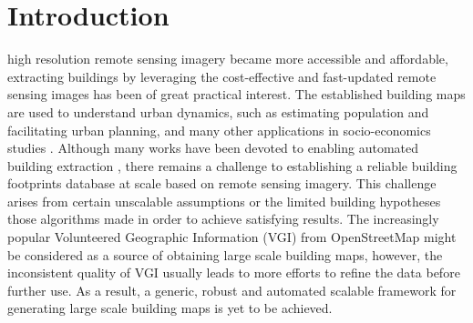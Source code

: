\documentclass[journal]{IEEEtran}
\begin{document}
%
\IEEEpeerreviewmaketitle



\section{Introduction}
% 
% 
% 
% 


 high resolution remote sensing imagery became more accessible and affordable, extracting buildings by leveraging the cost-effective and fast-updated remote sensing images has been of great practical interest. The established building maps are used to understand urban dynamics, such as estimating population and facilitating urban planning, and many other applications in socio-economics studies \cite{JensenCowen1999}. Although many works have been devoted to enabling automated building extraction \cite{Ok2013a,Ngo2017,Li2015,Kim1999,Hermosilla2011}, there remains a challenge to establishing a reliable building footprints database at scale based on remote sensing imagery. This challenge arises from certain unscalable assumptions or the limited building hypotheses those algorithms made in order to achieve satisfying results. The increasingly popular Volunteered Geographic Information (VGI) from OpenStreetMap \cite{HaklayWeber2008} might be considered as a source of obtaining large scale building maps, however, the inconsistent quality of VGI usually leads to more efforts to refine the data before further use. As a result, a generic, robust and automated scalable framework for generating large scale building maps is yet to be  achieved.
\end{document}
